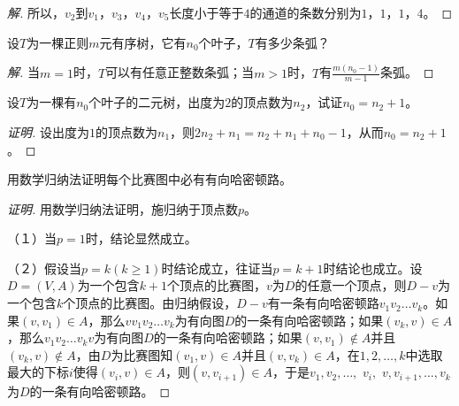 \documentclass{article}
\begin{document}
\begin{CJK}{UTF8}{gbsn}
\begin{proof}[解]
所以，$v_2$到$v_1$，$v_3$，$v_4$，$v_5$长度小于等于$4$的通道的条数分别为$1$，$1$，$1$，$4$。
  
\end{proof}
\begin{Exercise}
  设$T$为一棵正则$m$元有序树，它有$n_0$个叶子，$T$有多少条弧？
\end{Exercise}
\begin{proof}[解]
  当$m=1$时，$T$可以有任意正整数条弧；当$m>1$时，$T$有$\frac{m(n_0-1)}{m-1}$条弧。
\end{proof}
\begin{Exercise}
  设$T$为一棵有$n_0$个叶子的二元树，出度为$2$的顶点数为$n_2$，试证$n_0=n_2+1$。
\end{Exercise}
\begin{proof}[证明]
  设出度为$1$的顶点数为$n_1$，则$2n_2+n_1=n_2+n_1+n_0-1$，从而$n_0=n_2+1$。
\end{proof}
\begin{Exercise}
  用数学归纳法证明每个比赛图中必有有向哈密顿路。
\end{Exercise}
\begin{proof}[证明]
  用数学归纳法证明，施归纳于顶点数$p$。

  （１）当$p=1$时，结论显然成立。

  （２）假设当$p=k(k\geq 1)$时结论成立，往证当$p=k+1$时结论也成立。设$D=(V,A)$为一个包含$k+1$个顶点的比赛图，$v$为$D$的任意一个顶点，则$D-v$为一个包含$k$个顶点的比赛图。由归纳假设，$D-v$有一条有向哈密顿路$v_1v_2\ldots v_k$。如果$(v,v_1)\in A$，那么$vv_1v_2\ldots v_k$为有向图$D$的一条有向哈密顿路；如果$(v_k,v)\in A$，那么$v_1v_2\ldots v_kv$为有向图$D$的一条有向哈密顿路；如果$(v,v_1)\notin A$并且$(v_k,v)\notin A$，由$D$为比赛图知$(v_1,v)\in A$并且$(v,v_k)\in A$，在$1,2,\ldots, k$中选取最大的下标$i$使得$(v_i,v)\in A$，则$(v,v_{i+1})\in A$，于是$v_1, v_2,\ldots,$ $v_i,$ $v,v_{i+1},\ldots,v_k$为$D$的一条有向哈密顿路。 
\end{proof}

\end{CJK}
\end{document}
